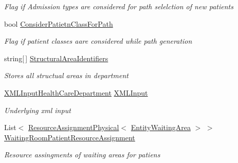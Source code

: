 \begin{DoxyCompactItemize}
\begin{DoxyCompactList}\small\item\em Flag if Admission types are considered for path selelction of new patients \end{DoxyCompactList}\item 
bool \hyperlink{class_general_health_care_elements_1_1_input_1_1_generic_x_m_l_department_input_a67adcd2bf9ebebd38fe3f1eb1bce9c50}{Consider\+Patietn\+Class\+For\+Path}
\begin{DoxyCompactList}\small\item\em Flag if patient classes aare considered while path generation \end{DoxyCompactList}\item 
string\mbox{[}$\,$\mbox{]} \hyperlink{class_general_health_care_elements_1_1_input_1_1_generic_x_m_l_department_input_a73d6e710fe47f71a1b99810d7fdefd30}{Structural\+Area\+Identifiers}
\begin{DoxyCompactList}\small\item\em Stores all structual areas in department \end{DoxyCompactList}\item 
\hyperlink{class_general_health_care_elements_1_1_input_1_1_x_m_l_input_health_care_department}{X\+M\+L\+Input\+Health\+Care\+Department} \hyperlink{class_general_health_care_elements_1_1_input_1_1_generic_x_m_l_department_input_ab0d2f9b0384a6128a87b418c0e6de8d7}{X\+M\+L\+Input}
\begin{DoxyCompactList}\small\item\em Underlying xml input \end{DoxyCompactList}\item 
List$<$ \hyperlink{class_general_health_care_elements_1_1_resource_handling_1_1_resource_assignment_physical}{Resource\+Assignment\+Physical}$<$ \hyperlink{class_general_health_care_elements_1_1_entities_1_1_entity_waiting_area}{Entity\+Waiting\+Area} $>$ $>$ \hyperlink{class_general_health_care_elements_1_1_input_1_1_generic_x_m_l_department_input_a2f33e87328a1fc59272a22c429a36017}{Waiting\+Room\+Patient\+Resource\+Assignment}
\begin{DoxyCompactList}\small\item\em Resource assingments of waiting areas for patiens \end{DoxyCompactList}\item 

\end{DoxyCompactItemize}
